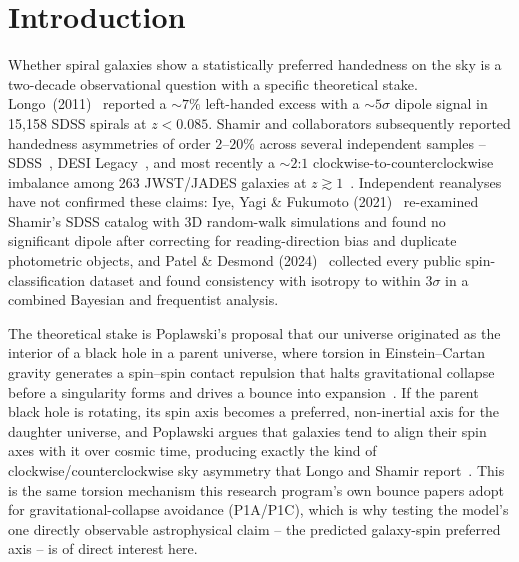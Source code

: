 \documentclass[twocolumn,linenumbers]{aastex702}
\begin{document}
\section{Introduction}
\label{sec:intro}

Whether spiral galaxies show a statistically preferred handedness on the sky
is a two-decade observational question with a specific theoretical stake.
Longo~(2011)~\cite{Longo:2011} reported a $\sim\!7\%$ left-handed excess with
a $\sim\!5\sigma$ dipole signal in 15,158 SDSS spirals at $z<0.085$. Shamir and
collaborators subsequently reported handedness asymmetries of order
$2$--$20\%$ across several independent samples --
SDSS~\cite{Shamir:2012,Shamir:2020}, DESI Legacy~\cite{Shamir:2022DESI}, and
most recently a $\sim\!2$:$1$ clockwise-to-counterclockwise imbalance among
263 JWST/JADES galaxies at $z\gtrsim1$~\cite{Shamir:2025JWST}. Independent
reanalyses have not confirmed these claims: Iye, Yagi \& Fukumoto
(2021)~\cite{Iye:2021} re-examined Shamir's SDSS catalog with 3D random-walk
simulations and found no significant dipole after correcting for reading-direction
bias and duplicate photometric objects, and Patel \& Desmond
(2024)~\cite{Patel:2024} collected every public spin-classification dataset
and found consistency with isotropy to within $3\sigma$ in a combined
Bayesian and frequentist analysis.

The theoretical stake is Poplawski's proposal that our universe originated as
the interior of a black hole in a parent universe, where torsion in
Einstein--Cartan gravity generates a spin--spin contact repulsion that halts
gravitational collapse before a singularity forms and drives a bounce into
expansion~\cite{Poplawski:2010,Poplawski:2012,Poplawski:2016}. If the parent
black hole is rotating, its spin axis becomes a preferred, non-inertial axis
for the daughter universe, and Poplawski argues that galaxies tend to align
their spin axes with it over cosmic time, producing exactly the kind of
clockwise/counterclockwise sky asymmetry that Longo and Shamir report~\cite{Poplawski:2020}.
This is the same torsion mechanism this research program's own bounce papers
adopt for gravitational-collapse avoidance (P1A/P1C), which is why testing
the model's one directly observable astrophysical claim -- the predicted
galaxy-spin preferred axis -- is of direct interest here.
\end{document}
